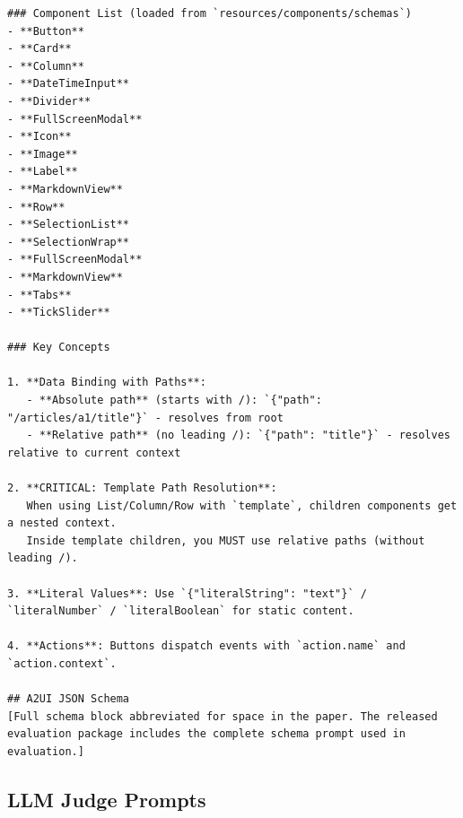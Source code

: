 \documentclass{llmxive}
\begin{document}
\begin{verbatim}
### Component List (loaded from `resources/components/schemas`)
- **Button**
- **Card**
- **Column**
- **DateTimeInput**
- **Divider**
- **FullScreenModal**
- **Icon**
- **Image**
- **Label**
- **MarkdownView**
- **Row**
- **SelectionList**
- **SelectionWrap**
- **FullScreenModal**
- **MarkdownView**
- **Tabs**
- **TickSlider**

### Key Concepts

1. **Data Binding with Paths**:
   - **Absolute path** (starts with /): `{"path": "/articles/a1/title"}` - resolves from root
   - **Relative path** (no leading /): `{"path": "title"}` - resolves relative to current context

2. **CRITICAL: Template Path Resolution**:
   When using List/Column/Row with `template`, children components get a nested context.
   Inside template children, you MUST use relative paths (without leading /).

3. **Literal Values**: Use `{"literalString": "text"}` / `literalNumber` / `literalBoolean` for static content.

4. **Actions**: Buttons dispatch events with `action.name` and `action.context`.

## A2UI JSON Schema
[Full schema block abbreviated for space in the paper. The released evaluation package includes the complete schema prompt used in evaluation.]
\end{verbatim}

\subsection{LLM Judge Prompts}
\label{app:a2ui-llm-judge-prompts}
\end{document}
